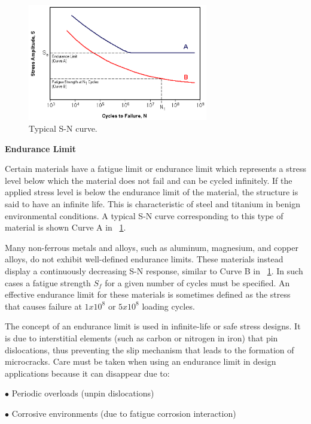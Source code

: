\documentclass[3p,times,procedia,number]{elsarticle}
\newcommand{\figref}[1]{\figurename~\ref{#1}}
\begin{document}
\begin{figure}[!h]
	\centering
	\includegraphics[width=0.7\textwidth]{figures//sn.png} 
	\caption{Typical S-N curve.}
	\label{fig.sn}
\end{figure}

\textbf{Endurance Limit}

Certain materials have a fatigue limit or endurance limit which represents a stress level below
which the material does not fail and can be cycled infinitely. If the applied stress level is below
the endurance limit of the material, the structure is said to have an infinite life. This is
characteristic of steel and titanium in benign environmental conditions. A typical S-N curve
corresponding to this type of material is shown Curve A in  \figref{fig.sn}.

Many non-ferrous metals and alloys, such as aluminum, magnesium, and copper alloys, do not
exhibit well-defined endurance limits. These materials instead display a continuously
decreasing S-N response, similar to Curve B in \figref{fig.sn}. In such cases a fatigue strength $S_f$ for
a given number of cycles must be specified. An effective endurance limit for these materials is
sometimes defined as the stress that causes failure at $1x10^8$ or $5x10^8$ loading cycles.

The concept of an endurance limit is used in infinite-life or safe stress designs. It is due to
interstitial elements (such as carbon or nitrogen in iron) that pin dislocations, thus preventing
the slip mechanism that leads to the formation of microcracks. Care must be taken when
using an endurance limit in design applications because it can disappear due to:

\vspace{6pt}
$\bullet$ Periodic overloads (unpin dislocations)

$\bullet$ Corrosive environments (due to fatigue corrosion interaction)
\end{document}
